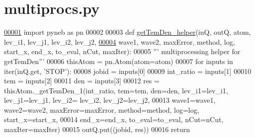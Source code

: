 \hypertarget{multiprocs_8py_source}{}\section{multiprocs.\+py}
\label{multiprocs_8py_source}

\begin{DoxyCode}
\hypertarget{multiprocs_8py_source_l00001}{}\hyperlink{namespacepyneb_1_1utils_1_1multiprocs}{00001} \textcolor{keyword}{import} pyneb \textcolor{keyword}{as} pn
00002 
00003 \textcolor{keyword}{def }\hyperlink{namespacepyneb_1_1utils_1_1multiprocs_a714d57392053c47df242a942eb959b69}{getTemDen\_helper}(inQ, outQ, atom, lev\_i1, lev\_j1, lev\_i2, lev\_j2,
\hypertarget{multiprocs_8py_source_l00004}{}\hyperlink{namespacepyneb_1_1utils_1_1multiprocs_a714d57392053c47df242a942eb959b69}{00004}          wave1, wave2, maxError, method, log, start\_x, end\_x, to\_eval, nCut, maxIter):
00005     \textcolor{stringliteral}{''' multiprocessing helper for getTemDen'''}
00006     thisAtom = pn.Atom(atom=atom)
00007     \textcolor{keywordflow}{for} inputs \textcolor{keywordflow}{in} iter(inQ.get, \textcolor{stringliteral}{'STOP'}):
00008         jobid = inputs[0]
00009         int\_ratio = inputs[1]
00010         tem = inputs[2]
00011         den = inputs[3]
00012         res = thisAtom.\_getTemDen\_1(int\_ratio, tem=tem, den=den, lev\_i1=lev\_i1, lev\_j1=lev\_j1, lev\_i2=
      lev\_i2, lev\_j2=lev\_j2,
00013                   wave1=wave1, wave2=wave2, maxError=maxError, method=method, log=log, start\_x=start\_x, 
00014                   end\_x=end\_x, to\_eval=to\_eval, nCut=nCut, maxIter=maxIter)
00015         outQ.put((jobid, res))
00016     \textcolor{keywordflow}{return}
\end{DoxyCode}
